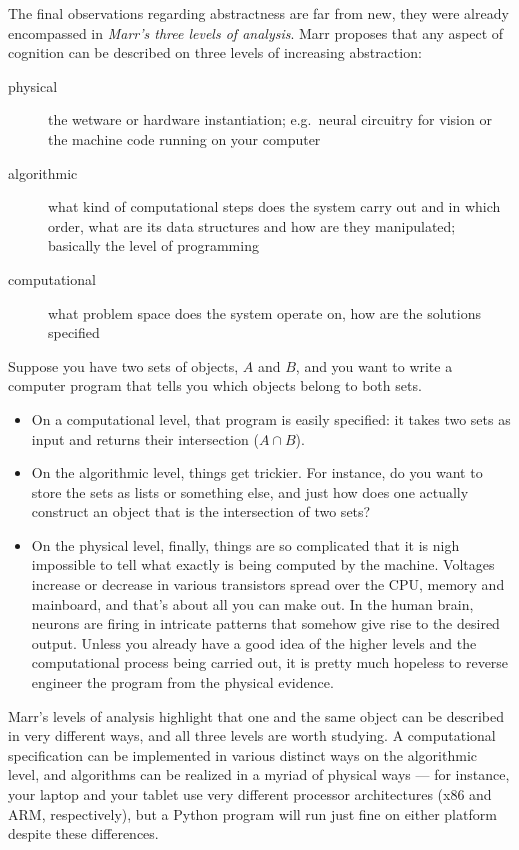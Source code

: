 The final observations regarding abstractness are far from new, they were already encompassed in \emph{Marr's three levels of analysis}. 
Marr proposes that any aspect of cognition can be described on three levels of increasing abstraction:
%
\begin{description}
    \item[physical] the wetware or hardware instantiation; e.g.\ neural circuitry for vision or the machine code running on your computer
    \item[algorithmic] what kind of computational steps does the system carry out and in which order, what are its data structures and how are they manipulated; basically the level of programming
    \item[computational] what problem space does the system operate on, how are the solutions specified
\end{description}
%
\begin{examplebox}
    Suppose you have two sets of objects, $A$ and $B$, and you want to write a computer program that tells you which objects belong to both sets.
    \begin{itemize}
        \item On a computational level, that program is easily specified: it takes two sets as input and returns their intersection ($A \cap B$).
        \item On the algorithmic level, things get trickier.
        For instance, do you want to store the sets as lists or something else, and just how does one actually construct an object that is the intersection of two sets?
    \item On the physical level, finally, things are so complicated that it is nigh impossible to tell what exactly is being computed by the machine.
        Voltages increase or decrease in various transistors spread over the CPU, memory and mainboard, and that's about all you can make out.
        In the human brain, neurons are firing in intricate patterns that somehow give rise to the desired output.
        Unless you already have a good idea of the higher levels and the computational process being carried out, it is pretty much hopeless to reverse engineer the program from the physical evidence.
    \end{itemize}
\end{examplebox}
%
Marr's levels of analysis highlight that one and the same object can be described in very different ways, and all three levels are worth studying.
A computational specification can be implemented in various distinct ways on the algorithmic level, and algorithms can be realized in a myriad of physical ways --- for instance, your laptop and your tablet use very different processor architectures (x86 and ARM, respectively), but a Python program will run just fine on either platform despite these differences.

